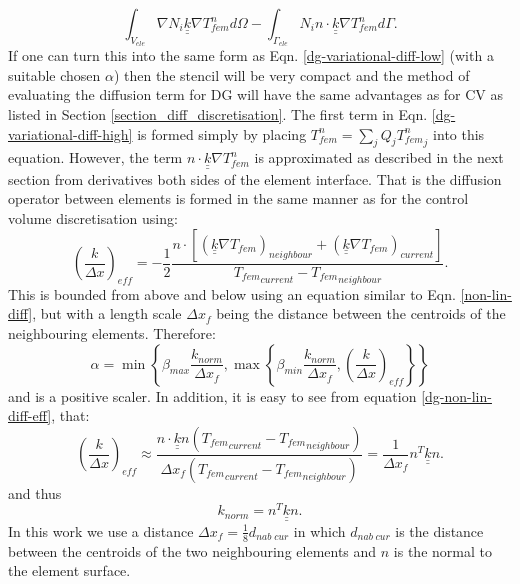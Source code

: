 \begin{equation}
\int_{V_{ele}} \nabla N_i \underline {\underline k} \nabla T_{fem}^n d\Omega 
-\int_{\Gamma_{ele}} N_i n\cdot \underline {\underline k} \nabla T_{fem}^n d\Gamma . 
\label{dg-variational-diff-high} 
\end{equation}
If one can turn this into the same form as Eqn. \ref{dg-variational-diff-low} (with a suitable chosen $\alpha$) then the stencil will be very compact and the method of evaluating the diffusion term for DG will have the same advantages as for CV as listed in Section \ref{section_diff_discretisation}.  The first term in Eqn. \ref{dg-variational-diff-high} is formed simply by placing  $T_{fem}^n=\sum_j Q_j {T_{fem}^n}_j$ into this equation. However, the term $n\cdot \underline {\underline k} \nabla T_{fem}^n $ is approximated as described in the next section from derivatives both sides of the element interface. That is the diffusion operator between elements is formed in the same manner as for the control volume discretisation using:
\begin{equation}
\left( \frac{k}{\Delta x} \right)_{eff} =  
- \frac{1}{2} \frac{ n\cdot \left[\left({\underline{\underline k}} \nabla T_{fem}\right)_{neighbour} + \left({\underline{\underline k}} \nabla T_{fem}\right)_{current} \right] }{{T_{fem}}_{current}-{T_{fem}}_{neighbour}} . 
\label{dg-non-lin-diff-eff} 
\end{equation}
This is bounded from above and below using an equation similar to Eqn. \ref{non-lin-diff}, but with a length scale $\Delta x_f$ being the distance between the centroids of the neighbouring elements. Therefore:
\begin{equation}
\alpha=\min\left\{  \beta_{max}\frac{k_{norm}}{{\Delta x}_{f}} , \max\left\{ \beta_{min}\frac{k_{norm}}{{\Delta x}_{f}} , 
\left( \frac{k}{\Delta x} \right)_{eff}
\right\} \right\} 
\label{dg-alpha-def} 
\end{equation} 
and is a positive scaler. In addition, it is easy to see from equation 
\ref{dg-non-lin-diff-eff}, that:
\begin{equation}
\left( \frac{k}{\Delta x} \right)_{eff} \approx  
  \frac{ n\cdot {\underline{\underline k}} n({T_{fem}}_{current}-{T_{fem}}_{neighbour}) }
{{\Delta x}_{f}({T_{fem}}_{current}-{T_{fem}}_{neighbour})} 
=\frac{1}{{\Delta x}_{f}} { n}^T {\underline{\underline k}} { n}. 
\label{k-norm-full} 
\end{equation}
and thus
\begin{equation}
k_{norm}={ n}^T {\underline{\underline k}} { n}. 
\label{k-norm} 
\end{equation} 
In this work we use a distance $\Delta x_f=\frac{1}{8} d_{nab\;cur}$ in 
which $d_{nab\;cur}$ is the distance between the centroids of the two neighbouring elements and $n$ is the normal to the element surface.
 

